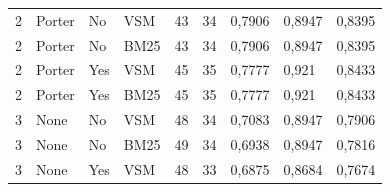 \begin{table}[h]
{\begin{tabular}{lllllllll}
\rowcolor[HTML]{C0C0C0} 
2                                   & Porter                         & No                               & VSM                             & 43                               & 34                              & 0,7906                           & 0,8947                        & 0,8395                         \\
\rowcolor[HTML]{C0C0C0} 
2                                   & Porter                         & No                               & BM25                            & 43                               & 34                              & 0,7906                           & 0,8947                        & 0,8395                         \\
\rowcolor[HTML]{C0C0C0} 
2                                   & Porter                         & Yes                              & VSM                             & 45                               & 35                              & 0,7777                           & 0,921                         & 0,8433                         \\
\rowcolor[HTML]{C0C0C0} 
2                                   & Porter                         & Yes                              & BM25                            & 45                               & 35                              & 0,7777                           & 0,921                         & 0,8433                         \\
\rowcolor[HTML]{9B9B9B} 
3                                   & None                           & No                               & VSM                             & 48                               & 34                              & 0,7083                           & 0,8947                        & 0,7906                         \\
\rowcolor[HTML]{9B9B9B} 
3                                   & None                           & No                               & BM25                            & 49                               & 34                              & 0,6938                           & 0,8947                        & 0,7816                         \\
\rowcolor[HTML]{9B9B9B} 
3                                   & None                           & Yes                              & VSM                             & 48                               & 33                              & 0,6875                           & 0,8684                        & 0,7674                         \\

\end{tabular}}
\end{table}
